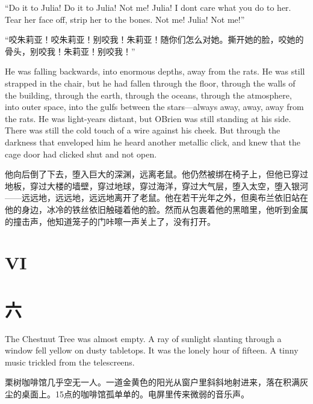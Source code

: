\begin{paracol}{2}
\switchcolumn*

``Do it to Julia! Do it to Julia! Not me! Julia! I don\textquotesingle t
care what you do to her. Tear her face off, strip her to the bones. Not
me! Julia! Not me!''

\switchcolumn

``咬朱莉亚！咬朱莉亚！别咬我！朱莉亚！随你们怎么对她。撕开她的脸，咬她的骨头，别咬我！朱莉亚！别咬我！''

\switchcolumn*

He was falling backwards, into enormous depths, away from the rats. He
was still strapped in the chair, but he had fallen through the floor,
through the walls of the building, through the earth, through the
oceans, through the atmosphere, into outer space, into the gulfs between
the stars---always away, away, away from the rats. He was light-years
distant, but O\textquotesingle Brien was still standing at his side.
There was still the cold touch of a wire against his cheek. But through
the darkness that enveloped him he heard another metallic click, and
knew that the cage door had clicked shut and not open.

\switchcolumn

他向后倒了下去，堕入巨大的深渊，远离老鼠。他仍然被绑在椅子上，但他已穿过地板，穿过大楼的墙壁，穿过地球，穿过海洋，穿过大气层，堕入太空，堕入银河——远远地，远远地，远远地离开了老鼠。他在若干光年之外，但奥布兰依旧站在他的身边，冰冷的铁丝依旧触碰着他的脸。然而从包裹着他的黑暗里，他听到金属的撞击声，他知道笼子的门咔嚓一声关上了，没有打开。

\switchcolumn*


\section{VI}\label{vi-2}

\switchcolumn

\section*{六}\label{ux4e8cux5341ux56db}

\switchcolumn*

The Chestnut Tree was almost empty. A ray of sunlight slanting through a
window fell yellow on dusty tabletops. It was the lonely hour of
fifteen. A tinny music trickled from the telescreens.

\switchcolumn

栗树咖啡馆几乎空无一人。一道金黄色的阳光从窗户里斜斜地射进来，落在积满灰尘的桌面上。15点的咖啡馆孤单单的。电屏里传来微弱的音乐声。


\end{paracol}

